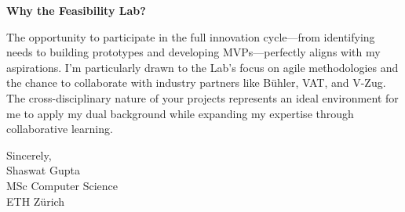 \documentclass[letterpaper,10pt]{article}
\newcommand{\letterSection}[1]{%
    \vspace{8 pt}
  \begin{sectionbox}
    \color{accentblue}\scshape\raggedright\large\bfseries #1
  \end{sectionbox}
  \vspace{4 pt}
}
\begin{document}
\letterSection{Why the Feasibility Lab?}
The opportunity to participate in the full innovation cycle—from identifying needs to building prototypes and developing MVPs—perfectly aligns with my aspirations. I'm particularly drawn to the Lab's focus on agile methodologies and the chance to collaborate with industry partners like Bühler, VAT, and V-Zug. The cross-disciplinary nature of your projects represents an ideal environment for me to apply my dual background while expanding my expertise through collaborative learning.

\vspace{8pt}

{\color{headercolor}
Sincerely,\\[12pt]
Shaswat Gupta\\
}
\vspace{8 pt}
{\color{mutedtext}
MSc Computer Science\\
ETH Zürich
}
\end{document}
